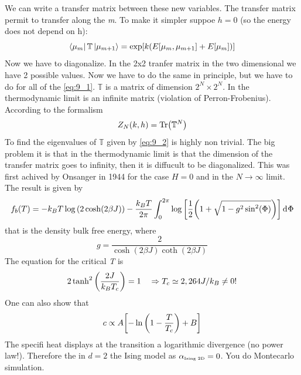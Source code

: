 \documentclass[../main/main.tex]{subfiles}
\begin{document}
We can write a transfer matrix between these new variables. The transfer matrix permit to transfer along the \emph{m}. To make it simpler suppoe \( h=0 \) (so the energy does not depend on h):
\begin{equation}
  \bra{\mu _m} \mathbb{T} \ket{\mu _{m+1}} = \exp [ k(E [\mu _m, \mu _{m+1}] + E [ \mu _m])]
  \label{eq:9_2}
\end{equation}
Now we have to diagonalize. In the 2x2 tranfer matrix in the two dimensional we have 2 possible values. Now we have to do the same in principle, but we have to do for all of the \eqref{eq:9_1}.
\( \mathbb{T} \) is a matrix of dimension \( 2^N \times 2^N \). In the thermodynamic limit is an infinite matrix (violation of Perron-Frobenius). According to the formalism
\begin{equation}
  Z_{N} (k,h) = \Tr(\mathbb{T}^N)
\end{equation}
To find the eigenvalues of \( \mathbb{T} \) given by  \eqref{eq:9_2} is highly non trivial. The big problem it is that in the thermodynamic limit is that the dimension of the transfer matrix goes to infinity, then it is diffucult to be diagonalized. This was first achived by Onsanger in 1944 for the case \( H=0 \) and in the \( N \rightarrow \infty  \) limit. The result is given by
\begin{equation}
  f_b (T) = -k_B T \log{\qty(2 \cosh(2 \beta J))- \frac{k_B T}{2 \pi} \int_{0}^{2\pi} \log{\qty[\frac{1}{2}\qty(1+ \sqrt{1-g^2 \sin^2(\Phi) } )] } \dd[]{\Phi }  }
\end{equation}
that is the density bulk free energy, where
\begin{equation}
  g = \frac{2}{\cosh(2 \beta J)\coth(2 \beta J)}
\end{equation}
The equation for the critical \emph{T} is
\begin{equation}
  2 \tanh^2 \qty(\frac{2J}{k_B T_c}) = 1 \quad \Rightarrow T_c \simeq 2,264 J/k_B \neq 0!
\end{equation}
One can also show that
\begin{equation}
  c \propto A \qty[-\ln{\qty(1- \frac{T}{T_c}) } + B  ]
\end{equation}
The specifi heat displays at the transition a logarithmic divergence (no power law!). Therefore the in \( d=2 \)  the Ising model as \( \alpha _{\text{\tiny Ising 2D}} =0\).
You do Montecarlo simulation.
\end{document}
